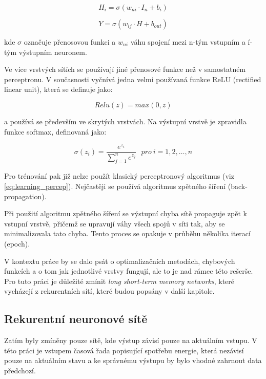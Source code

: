 \documentclass[FM,BP,fonts]{tulthesis}
\begin{document}
\begin{equation}
	H_i = \sigma(w_{ni} \cdot I_n + b_i)
\end{equation}


\begin{equation}
	Y = \sigma(w_{ij} \cdot H + b_{out})
\end{equation}

kde $\sigma$ označuje přenosovou funkci a $w_{ni}$ váhu spojení mezi n-tým vstupním a í-tým výstupním neuronem.

Ve více vrstvých sítích se používají jiné přenosové funkce než v samostatném perceptronu. V současnosti vyčnívá jedna velmi používaná funkce ReLU (rectified linear unit), která se definuje jako:

\begin{equation}
	Relu(z) = max(0, z)
\end{equation}

a používá se především ve skrytých vrstvách. \cite{brownlee2019gentle} Na výstupní vrstvě je zpravidla funkce softmax, definovaná jako:

\begin{equation}
	\sigma(z_i) = \frac{e^{z_{i}}}{\sum_{j=1}^n e^{z_{j}}} \ \ \ pro\ i=1,2,\dots,n
\end{equation}

Pro trénování pak již nelze použít klasický perceptronový algoritmus (viz \ref{eq:learning_percep}). Nejčastěji se používá algoritmus zpětného šíření (back-propagation).

Při použití algoritmu zpětného šíření se výstupní chyba sítě propaguje zpět k vstupní vrstvě, přičemž se upravují váhy všech spojů v síti tak, aby se minimalizovala tato chyba. Tento proces se opakuje v průběhu několika iterací (epoch).

V kontextu práce by se dalo psát o optimalizačních metodách, chybových funkcích a o tom jak jednotlivé vrstvy fungují, ale to je nad rámec této rešerše. Pro tuto práci je důležité zmínit \textit{long short-term memory networks}, které vycházejí z rekurentních sítí, které budou popsány v další kapitole.


\subsection{Rekurentní neuronové sítě}
Zatím byly zmíněny pouze sítě, kde výstup závisí pouze na aktuálním vstupu. V této práci je vstupem časová řada popisující spotřebu energie, která nezávisí pouze na aktuálním stavu a ke správnému výstupu by bylo vhodné zahrnout data předchozí.
\end{document}
